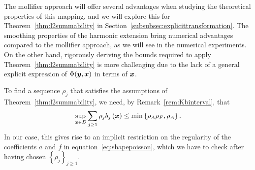 The mollifier approach will offer several advantages when studying the theoretical properties of this mapping, and we will explore this for Theorem~\ref{thm:l2summability} in Section~\ref{subsubsec:explicittransformation}.
The smoothing properties of the harmonic extension bring numerical advantages compared to the mollifier approach, as we will see in the numerical experiments.
On the other hand, rigorously deriving the bounds required to apply Theorem~\ref{thm:l2summability} is more challenging due to the lack of a general explicit expression of $\Phi({\bm{y}},{{\bm{x}}})$ in terms of ${{\bm{x}}}$.
\begin{remark}
    To find a sequence $\rho_j$ that satisfies the assumptions of Theorem~\ref{thm:l2summability}, we need, by Remark~\ref{rem:Kbinterval}, that
    \begin{equation}
        \sup_{{{\bm{x}}}\in D}\sum_{j \geq 1} \rho_j b_j\left({{\bm{x}}} \right) \leq \min\left\{ \rho_A \rho_F, \rho_A \right\}.\label{eq:nessrhosumrhoarhof2}
    \end{equation}
    In our case, this gives rise to an implicit restriction on the regularity of the coefficients $a$ and $f$ in equation~\eqref{eq:shapepoisson}, which we have to check after having chosen $\left\{ \rho_j \right\}_{j\geq 1}$.
\end{remark}

